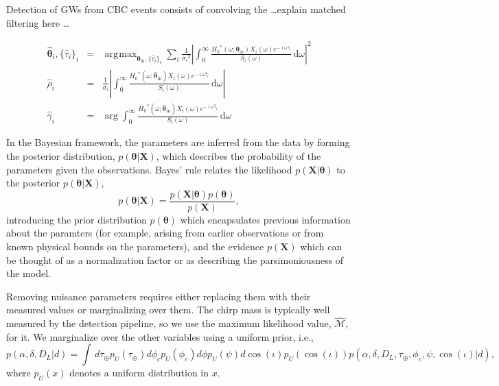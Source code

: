 \documentclass{iopart}
\DeclareMathOperator*{\argmax}{\arg\!\max}
\begin{document}
Detection of \acp{GW} from \ac{CBC} events consists of convolving the \dots explain matched filtering here \dots

\begin{eqnarray}
\hat{\boldsymbol\theta}_i, \{\hat\tau_i\}_i &=& \argmax_{\boldsymbol\theta_\mathrm{in}, \{\hat\tau_i\}_i} \sum_i \frac{1}{{\sigma_i}^2} \left| \int_0^\infty \frac{{H_0}^*(\omega; \boldsymbol\theta_\mathrm{in}) X_i(\omega) e^{-\imath \omega \tau_i}}{S_i(\omega)} \,\mathrm{d}\omega \right|^2 \\
\hat\rho_i &=& \frac{1}{\sigma_i} \left| \int_0^\infty \frac{{H_0}^*(\omega; \hat{\boldsymbol\theta}_\mathrm{in}) X_i(\omega) e^{-\imath \omega \hat\tau_i}}{S_i(\omega)} \,\mathrm{d}\omega \right| \\
\hat\gamma_i &=& \arg \int_0^\infty \frac{{H_0}^*(\omega; \hat{\boldsymbol\theta}_\mathrm{in}) X_i(\omega) e^{-\imath \omega \hat\tau_i}}{S_i(\omega)} \,\mathrm{d}\omega
\end{eqnarray}

In the Bayesian framework, the parameters are inferred from the data by forming the posterior distribution, $p(\boldsymbol\theta|\mathbf X)$, which describes the probability of the parameters given the observations. Bayes' rule relates the likelihood $p(\mathbf X|\boldsymbol\theta)$ to the posterior $p(\boldsymbol\theta|\mathbf X)$,
%
\begin{equation}\label{bayes}
p(\boldsymbol\theta|\mathbf X) = \frac{p(\mathbf X|\boldsymbol\theta) p(\boldsymbol\theta)}{p(\mathbf X)},
\end{equation}
%
introducing the prior distribution $p(\boldsymbol\theta)$ which encapsulates previous information about the paramters (for example, arising from earlier observations or from known physical bounds on the parameters), and the evidence $p(\mathbf X)$ which can be thought of as a normalization factor or as describing the parsimoniousness of the model.

Removing nuisance parameters requires either replacing them with their measured values or marginalizing over them. The chirp mass is typically well measured by the detection pipeline, so we use the maximum likelihood value, $\hat{\mathcal{M}}$, for it. We marginalize over the other variables using a uniform prior, i.e.,
%
\begin{equation}
p(\alpha,\delta,D_L|d) = \int\, d\tau_\oplus p_U(\tau_\oplus) d\phi_c p_U(\phi_c) d\phi p_U(\psi)  d\cos(\iota) p_U(\cos(\iota)) p(\alpha,\delta,D_L,\tau_\oplus,\phi_c,\psi,\cos(\iota)|d),
\end{equation}
%
where $p_U(x)$ denotes a uniform distribution in $x$.
\end{document}
